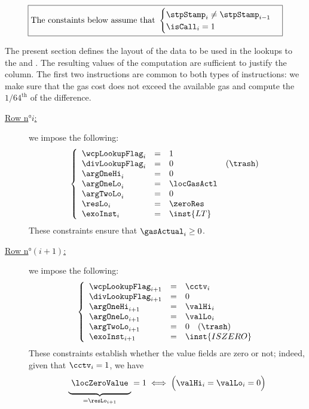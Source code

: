 \[
	\boxed{\text{The constaints below assume that }
	\begin{cases}
		\stpStamp_{i} \neq \stpStamp_{i - 1} \\
		\isCall  _{i} =    1                 \\
	\end{cases} }
\]

The present section defines the layout of the data to be used in the lookups to the \wcpMod{} and \modMod{}. The resulting values of the computation are sufficient to justify the \gasStipend{} column. The first two instructions are common to both types of instructions: we make sure that the gas cost does not exceed the available gas and compute the $1/64^{\text{th}}$ of the difference. 
\begin{description}
	\item[\underline{Row n$°i$:}] we impose the following:
		\[
			\left\{ \begin{array}{lclc}
				\wcpLookupFlag_{i} & = & 1 \\
				\divLookupFlag_{i} & = & 0 & (\trash) \\
				\argOneHi_{i}      & = & 0 \\
				\argOneLo_{i}      & = & \locGasActl \\
				\argTwoLo_{i}      & = & 0 \\
				\resLo_{i}         & = & \zeroRes \\
				\exoInst_{i}       & = & \inst{LT} \\
			\end{array} \right.
		\]
		These constraints ensure that $\gasActual_{i} \geq 0$.
	\item[\underline{Row n$°(i + 1)$:}] we impose the following:
		\[
			\left\{ \begin{array}{lclc}
				\wcpLookupFlag_{i + 1} & = & \cctv_{i} \\
				\divLookupFlag_{i + 1} & = & 0 \\
				\argOneHi_{i + 1}      & = & \valHi_{i} \\
				\argOneLo_{i + 1}      & = & \valLo_{i} \\
				\argTwoLo_{i + 1}      & = & 0  \quad (\trash) \\
				\exoInst_{i + 1}       & = & \inst{ISZERO} \\
			\end{array} \right.
		\]
		These constraints establish whether the value fields are zero or not; indeed, given that $\cctv_{i} = 1$, we have
		\[
			\underbrace{\phantom{\Big|}\locZeroValue\phantom{\Big|}}_{=\resLo_{i + 1}} = 1 \iff \Big(\valHi_{i} = \valLo_{i} = 0 \Big)
\]
\end{description}
